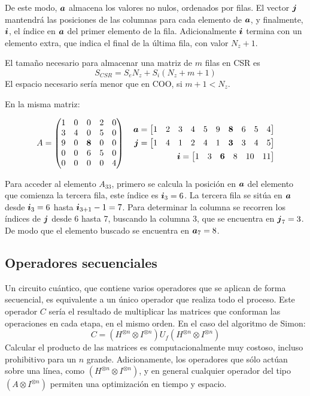 De este modo, $\boldsymbol{a}$ almacena los valores no nulos, ordenados por filas. El vector 
$\boldsymbol{j}$ mantendrá las posiciones de las columnas para cada elemento de $\boldsymbol{a}$, y 
finalmente, $\boldsymbol{i}$, el índice en $\boldsymbol{a}$ del primer elemento de la fila.  
Adicionalmente $\boldsymbol{i}$ termina con un elemento extra, que indica el final de la 
última fila, con valor $N_z + 1$.

El tamaño necesario para almacenar una matriz de $m$ filas en CSR es
$$ S_{CSR} = S_e N_z + S_i (N_z + m + 1) $$
El espacio necesario sería menor que en COO, si $m + 1 < N_z$.

\begin{ejemplo} En la misma matriz:

$$ A = \begin{pmatrix} 
	1 & 0 & 0 & 2 & 0 \\
	3 & 4 & 0 & 5 & 0 \\
	9 & 0 & \textbf{8} & 0 & 0 \\
	0 & 0 & 6 & 5 & 0 \\
	0 & 0 & 0 & 0 & 4  \end{pmatrix}
\quad
\begin{aligned}
	\boldsymbol{a} = \begin{bmatrix}  1 & 2 & 3 & 4 & 5  & 9 & \textbf{8} & 6 & 5 & 4 \end{bmatrix} \\
	\boldsymbol{j} = \begin{bmatrix}  1 & 4 & 1 & 2 & 4  & 1 & \textbf{3} & 3 & 4 & 5 \end{bmatrix}\\
	\boldsymbol{i} = \begin{bmatrix}  1 & 3 & \textbf{6} & 8 & 10 & 11 \end{bmatrix}
\end{aligned}
$$

Para acceder al elemento $A_{33}$, primero se calcula la posición en $\boldsymbol{a}$ del 
elemento que comienza la tercera fila, este índice es $\boldsymbol{i}_3 = 6$. La tercera 
fila se sitúa en $\boldsymbol{a}$ desde $\boldsymbol{i}_3 = 6$ hasta $\boldsymbol{i}_{3+1}-1 = 7$.  Para determinar 
la columna se recorren los índices de $\boldsymbol{j}$ desde 6 hasta 7, buscando la columna 
3, que se encuentra en $\boldsymbol{j}_7 = 3$. De modo que el elemento buscado se encuentra 
en $\boldsymbol{a}_7 = 8$.

\subsection{Operadores secuenciales}
Un circuito cuántico, que contiene varios operadores que se aplican de forma 
secuencial, es equivalente a un único operador que realiza todo el proceso. Este 
operador $C$ sería el resultado de multiplicar las matrices que conforman las 
operaciones en cada etapa, en el mismo orden. En el caso del algoritmo de Simon:
%
$$ C = (H^{\otimes n} \otimes I^{\otimes n}) U_f (H^{\otimes n} \otimes 
I^{\otimes n})$$
%
Calcular el producto de las matrices es computacionalmente muy costoso, incluso 
prohibitivo para un $n$ grande. Adicionamente, los operadores que sólo actúan 
sobre una línea, como $(H^{\otimes n} \otimes I^{\otimes n})$, y en general 
cualquier operador del tipo $(A \otimes I^{\otimes n})$ permiten una 
optimización en tiempo y espacio.


\end{ejemplo}
